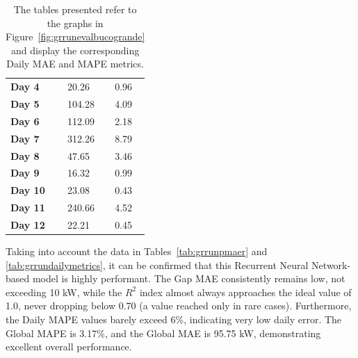 \begin{table}[H]
\begin{minipage}[t]{.45\textwidth}
\begin{center}
\begin{tabular}[t]{l|l|l}
				\textbf{Day 4}  & 20.26  & 0.96                          \\
				\textbf{Day 5}  & 104.28 & 4.09                          \\
				\textbf{Day 6}  & 112.09 & 2.18                          \\
				\textbf{Day 7}  & 312.26 & 8.79                          \\
				\textbf{Day 8}  & 47.65  & 3.46                          \\
				\textbf{Day 9}  & 16.32  & 0.99                          \\
				\textbf{Day 10} & 23.08  & 0.43                          \\
				\textbf{Day 11} & 240.66 & 4.52                          \\
				\textbf{Day 12} & 22.21  & 0.45
			\end{tabular}
		\end{center}
	\end{minipage}
	\caption{The tables presented refer to the graphs in Figure~\ref{fig:grrunevalbucogrande} and display the corresponding Daily MAE and MAPE metrics.}\label{tab:grrunbuchigrandi}
\end{table}

Taking into account the data in Tables~\ref{tab:grrunpmaer}
and \ref{tab:grrundailymetrics}, it can be confirmed that this
Recurrent Neural Network-based model is highly performant.
The Gap MAE consistently remains low, not exceeding 10 kW,
while the $R^2$ index almost always approaches the ideal value of 1.0\cite{metrics}, never dropping below 0.70 (a value reached only in rare cases). Furthermore, the Daily MAPE values barely exceed 6\%, indicating very low daily error. The Global MAPE is 3.17\%, and the Global MAE is 95.75 kW, demonstrating excellent overall performance.


